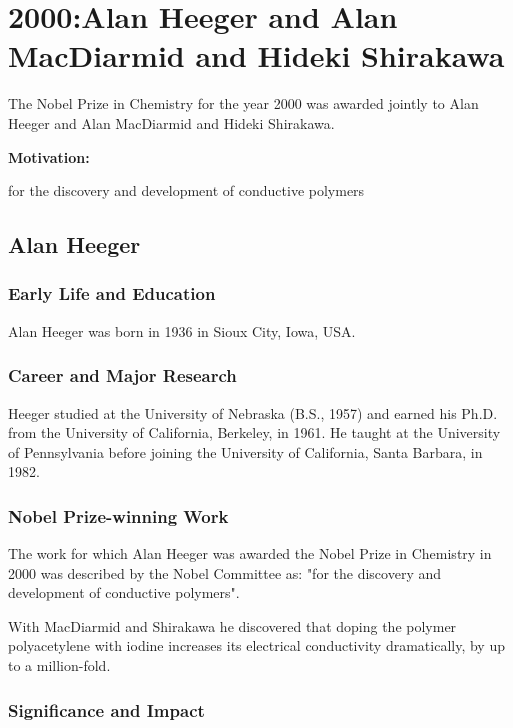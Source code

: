 \chapter{2000:Alan Heeger and Alan MacDiarmid and Hideki Shirakawa}

\label{chap:chemistry2000}

The Nobel Prize in Chemistry for the year 2000 was awarded jointly to Alan Heeger and Alan MacDiarmid and Hideki Shirakawa.

\textbf{Motivation:}

for the discovery and development of conductive polymers

\section{Alan Heeger}

\subsection*{Early Life and Education}

Alan Heeger was born in 1936 in Sioux City, Iowa, USA.

\subsection*{Career and Major Research}

Heeger studied at the University of Nebraska (B.S., 1957) and earned his Ph.D. from the University of California, Berkeley, in 1961. He taught at the University of Pennsylvania before joining the University of California, Santa Barbara, in 1982.

\subsection*{Nobel Prize-winning Work}

The work for which Alan Heeger was awarded the Nobel Prize in Chemistry in 2000 was described by the Nobel Committee as: "for the discovery and development of conductive polymers".

With MacDiarmid and Shirakawa he discovered that doping the polymer polyacetylene with iodine increases its electrical conductivity dramatically, by up to a million-fold.

\subsection*{Significance and Impact}


